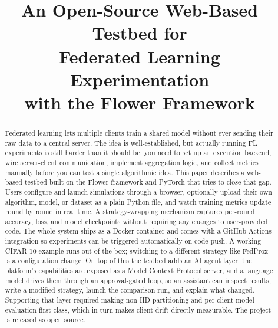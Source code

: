 \documentclass[conference]{IEEEtran}
\begin{document}
\title{An Open-Source Web-Based Testbed for\\
       Federated Learning Experimentation\\
       with the Flower Framework}

\author{
}

\maketitle

\begin{abstract}
Federated learning lets multiple clients train a shared model without
ever sending their raw data to a central server.
The idea is well-established, but actually running FL experiments is still
harder than it should be: you need to set up an execution backend,
wire server-client communication, implement aggregation logic, and
collect metrics manually before you can test a single algorithmic idea.
This paper describes a web-based testbed built on the Flower framework and
PyTorch that tries to close that gap.
Users configure and launch simulations through a browser, optionally upload
their own algorithm, model, or dataset as a plain Python file, and watch
training metrics update round by round in real time.
A strategy-wrapping mechanism captures per-round accuracy, loss, and
model checkpoints without requiring any changes to user-provided code.
The whole system ships as a Docker container and comes with a GitHub Actions
integration so experiments can be triggered automatically on code push.
A working CIFAR-10 example runs out of the box; switching to a different
strategy like FedProx is a configuration change.
On top of this the testbed adds an AI agent layer: the platform's
capabilities are exposed as a Model Context Protocol server, and a
language model drives them through an approval-gated loop, so an assistant
can inspect results, write a modified strategy, launch the comparison run,
and explain what changed.
Supporting that layer required making non-IID partitioning and per-client
model evaluation first-class, which in turn makes client drift directly
measurable.
The project is released as open source.
\end{abstract}
\end{document}
